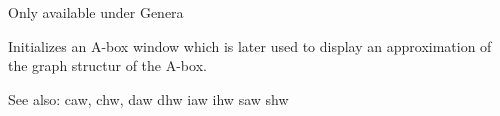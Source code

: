 
Only available under Genera

Initializes an A-box window which is later used to display an
approximation of the graph structur of the A-box.

See also: caw, chw, daw dhw iaw ihw saw shw

